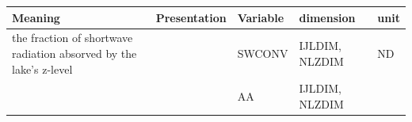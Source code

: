 \setlength\LTleft{0pt}\setlength\LTright{0pt}\begin{longtable}[]{@{}lllll@{}}
\toprule\relax
\begin{minipage}[b]{0.44\columnwidth}\raggedright
Meaning\strut
\end{minipage} & \begin{minipage}[b]{0.15\columnwidth}\raggedright
Presentation\strut
\end{minipage} & \begin{minipage}[b]{0.07\columnwidth}\raggedright
Variable\strut
\end{minipage} & \begin{minipage}[b]{0.10\columnwidth}\raggedright
dimension\strut
\end{minipage} & \begin{minipage}[b]{0.10\columnwidth}\raggedright
unit\strut
\end{minipage}\tabularnewline
\midrule\relax
\endhead
\begin{minipage}[t]{0.44\columnwidth}\raggedright
the fraction of shortwave radiation absorved by the lake's z-level\strut
\end{minipage} & \begin{minipage}[t]{0.15\columnwidth}\raggedright
\strut
\end{minipage} & \begin{minipage}[t]{0.07\columnwidth}\raggedright
SWCONV\strut
\end{minipage} & \begin{minipage}[t]{0.10\columnwidth}\raggedright
IJLDIM, NLZDIM\strut
\end{minipage} & \begin{minipage}[t]{0.10\columnwidth}\raggedright
\(\mathrm{ND}\)\strut
\end{minipage}\tabularnewline
\begin{minipage}[t]{0.44\columnwidth}\raggedright
\strut
\end{minipage} & \begin{minipage}[t]{0.15\columnwidth}\raggedright
\strut
\end{minipage} & \begin{minipage}[t]{0.07\columnwidth}\raggedright
AA\strut
\end{minipage} & \begin{minipage}[t]{0.10\columnwidth}\raggedright
IJLDIM, NLZDIM\strut
\end{minipage} & \begin{minipage}[t]{0.10\columnwidth}\raggedright
\strut
\end{minipage}\tabularnewline

\end{longtable}
